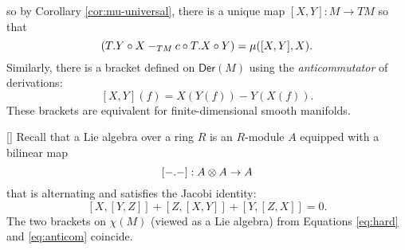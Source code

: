 so by Corollary \ref{cor:mu-universal}, there is a unique map $[X,Y]:M \to TM$ so that
\begin{equation}\label{eq:hard}
    (T.Y \circ X -_{TM} c \circ T.X \circ Y) = \mu([X,Y], X).
\end{equation}
Similarly, there is a bracket defined on $\mathsf{Der}(M)$ using the \emph{anticommutator} of derivations:
\begin{equation}\label{eq:anticom}
    [X,Y](f) = X(Y(f)) - Y(X(f)).
\end{equation}
These brackets are equivalent for finite-dimensional smooth manifolds.
\begin{proposition}\label{prop:anti-commm-lie}[\cite{Mackenzie2013}]
    Recall that a Lie algebra over a ring $R$ is an $R$-module $A$ equipped with a bilinear map
    \[
        [-.-]: A \otimes A \to A   
    \]%
    that is alternating and satisfies the Jacobi identity:
    \[
        [X,[Y,Z]] + [Z,[X,Y]] + [Y, [Z,X]] = 0.  
    \]
    The two brackets on $\chi(M)$ (viewed as a Lie algebra) from Equations \ref{eq:hard} and \ref{eq:anticom} coincide.
\end{proposition}
